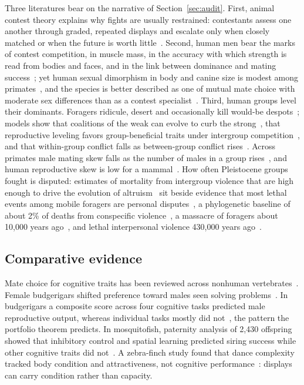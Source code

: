 Three literatures bear on the narrative of Section~\ref{sec:audit}. First, animal contest theory explains why fights are
usually restrained: contestants assess one another through graded, repeated displays and escalate only when closely matched or
when the future is worth little~\cite{maynardsmith1973,parker1974,enquist1983,enquist1990,arnott2009}. Second, human men bear
the marks of contest competition, in muscle mass, in the accuracy with which strength is read from bodies and faces, and in
the link between dominance and mating success~\cite{puts2010,sell2009,lassek2009,hill2013}; yet human sexual dimorphism in body
and canine size is modest among primates~\cite{plavcan2012}, and the species is better described as one of mutual mate choice
with moderate sex differences than as a contest specialist~\cite{stewartwilliams2013}. Third, human groups level their
dominants. Foragers ridicule, desert and occasionally kill would-be despots~\cite{boehm1993,boehm1999}; models show that
coalitions of the weak can evolve to curb the strong~\cite{gavrilets2012,pandit2003}, that reproductive leveling favors
group-beneficial traits under intergroup competition~\cite{bowles2006}, and that within-group conflict falls as between-group
conflict rises~\cite{reeve2007}. Across primates male mating skew falls as the number of males in a group
rises~\cite{kutsukake2006}, and human reproductive skew is low for a mammal~\cite{ross2023}. How often Pleistocene groups
fought is disputed: estimates of mortality from intergroup violence that are high enough to drive the evolution of
altruism~\cite{bowles2009} sit beside evidence that most lethal events among mobile foragers are personal
disputes~\cite{fry2013}, a phylogenetic baseline of about 2\% of deaths from conspecific violence~\cite{gomez2016}, a massacre
of foragers about 10,000 years ago~\cite{lahr2016}, and lethal interpersonal violence 430,000 years ago~\cite{sala2015}.

\subsection{Comparative evidence}

Mate choice for cognitive traits has been reviewed across nonhuman vertebrates~\cite{boogert2011}. Female budgerigars shifted
preference toward males seen solving problems~\cite{chen2019}. In budgerigars a composite score across four cognitive tasks
predicted male reproductive output, whereas individual tasks mostly did not~\cite{medinagarcia2021}, the pattern the portfolio
theorem predicts. In mosquitofish, paternity analysis of 2,430 offspring showed that inhibitory control and spatial learning
predicted siring success while other cognitive traits did not~\cite{vinogradov2025}. A zebra-finch study found that dance
complexity tracked body condition and attractiveness, not cognitive performance~\cite{baroudagues2025}: displays can carry
condition rather than capacity.

